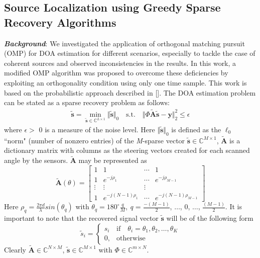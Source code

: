 \documentclass[12pt,a4paper]{article}
\theoremstyle{plain}
\theoremstyle{definition}
\begin{document}
\subsection{Source Localization using Greedy Sparse Recovery Algorithms}
\textbf{\emph{Background}}:
We investigated the application of orthogonal matching pursuit (OMP) for DOA estimation for different scenarios, especially to tackle the case of coherent sources and observed inconsistencies in the results. In this work, a modified OMP algorithm was proposed to overcome these deficiencies by exploiting an orthogonality condition using only one time sample. This work is based on the probabilistic approach described in [\citet{R37,R38}]. The DOA estimation problem can be stated as a sparse recovery problem as follows:
\begin{align}\label{eq:4}
\tilde{\textbf{s}} = \min_{\tilde{\textbf{s}} \in \mathbb{C}^{L\times 1}} \Vert\tilde{\textbf{s}}\Vert_{0}\quad\text{s.t.}\quad\Vert\Phi\tilde{\textbf{A}}\tilde{\textbf{s}} - \textbf{y}\Vert_2^2 \le \epsilon
\end{align}
where $\epsilon >$ 0 is a measure of the noise level. Here $\Vert\tilde{\textbf{s}}\Vert_{0}$ is defined as the $\ell_0$ ``norm" (number of nonzero entries) of the \textit{M}-sparse vector $\tilde{\textbf{s}}\in\mathbb{C}^{M\times 1}$, $\tilde{\textbf{A}}$ is a dictionary matrix with columns as the steering vectors created for each scanned angle by the sensors. $\tilde{\textbf{A}}$ may be represented as
\begin{equation}
\tilde{\textbf{A}}(\theta)=
\begin{bmatrix}
1 & 1 & \cdots & 1\\
1 & e^{-j\rho_1} & \cdots & e^{-j\rho_{M - 1}}\\
\vdots & \vdots & \vdots \\
1 &  e^{-j(N - 1)\rho_1} & \cdots & e^{-j(N - 1)\rho_{M -1}} 
\end{bmatrix}
\end{equation}
Here \(\rho_q = \frac{{2}\pi{d}}{\lambda} sin(\theta_{q})\) with $\theta_q = 180^\circ\frac{q}{M}$, \textit{q} = $\frac{-(M-1)}{2}$, $\hdots$, 0, $\hdots$, $\frac{(M-1)}{2}$. It is important to note that the recovered signal vector $\tilde{\textbf{s}}$ will be of the following form
\[
    \tilde{s}_i= 
\begin{cases}
    s_{i} & \text{if}\quad \theta_{i} = \theta_1, \theta_2, \hdots, \theta_K\\
    0, & \text{otherwise}
\end{cases}
\] 
\noindent Clearly $\tilde{\textbf{A}}\in \mathbb{C}^{N\times M}$, $\tilde{\textbf{s}} \in\mathbb{C}^{M\times 1}$ with $\Phi\in \mathbb{C}^{m\times N}$.
\end{document}
